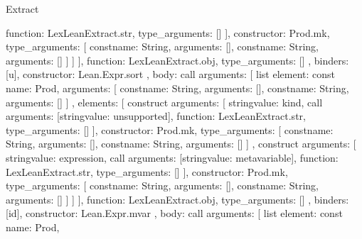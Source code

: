 \begin{lexlean}{Extract}
\begin{toolingmodule}
{{{{{{{{                          function: LexLeanExtract.str,
                          type_arguments: []
                        }
                      ],
                      constructor: Prod.mk,
                      type_arguments: [
                        const{name: String, arguments: []},
                        const{name: String, arguments: []}
                      ]
                    }
                  ]
                }
              ],
              function: LexLeanExtract.obj,
              type_arguments: []
            },
            binders: [u],
            constructor: Lean.Expr.sort
          },
          {
            body: call{
              arguments: [
                list{
                  element: const{
                    name: Prod,
                    arguments: [
                      const{name: String, arguments: []},
                      const{name: String, arguments: []}
                    ]
                  },
                  elements: [
                    construct{
                      arguments: [
                        string{value: kind},
                        call{
                          arguments: [string{value: unsupported}],
                          function: LexLeanExtract.str,
                          type_arguments: []
                        }
                      ],
                      constructor: Prod.mk,
                      type_arguments: [
                        const{name: String, arguments: []},
                        const{name: String, arguments: []}
                      ]
                    },
                    construct{
                      arguments: [
                        string{value: expression},
                        call{
                          arguments: [string{value: metavariable}],
                          function: LexLeanExtract.str,
                          type_arguments: []
                        }
                      ],
                      constructor: Prod.mk,
                      type_arguments: [
                        const{name: String, arguments: []},
                        const{name: String, arguments: []}
                      ]
                    }
                  ]
                }
              ],
              function: LexLeanExtract.obj,
              type_arguments: []
            },
            binders: [id],
            constructor: Lean.Expr.mvar
          },
          {
            body: call{
              arguments: [
                list{
                  element: const{
                    name: Prod,
}}}}}}}
\end{toolingmodule}
\end{lexlean}
